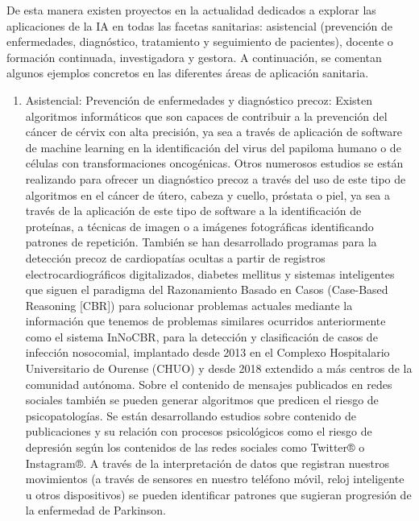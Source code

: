 \documentclass[10pt]{article}
\begin{document}
        
        De esta manera existen proyectos en la actualidad dedicados a explorar las aplicaciones de la IA en todas las facetas sanitarias: asistencial (prevención de enfermedades, diagnóstico, tratamiento y seguimiento de pacientes), docente o formación continuada, investigadora y gestora. A continuación, se comentan algunos ejemplos concretos en las diferentes áreas de aplicación sanitaria.
\begin{enumerate}
    \item Asistencial: Prevención de enfermedades y diagnóstico precoz: Existen algoritmos informáticos que son capaces de contribuir a la prevención del cáncer de cérvix con alta precisión, ya sea a través de aplicación de software de machine learning en la identiﬁcación del virus del papiloma humano o de células con transformaciones oncogénicas. Otros numerosos estudios se están realizando para ofrecer un diagnóstico precoz a través del uso de este tipo de algoritmos en el cáncer de útero, cabeza y cuello, próstata o piel, ya sea a través de la aplicación de este tipo de software a la identiﬁcación de proteínas, a técnicas de imagen o a imágenes fotográﬁcas identiﬁcando patrones de repetición. También se han desarrollado programas para la detección precoz de cardiopatías ocultas a partir de registros electrocardiográﬁcos digitalizados, diabetes mellitus y sistemas inteligentes que siguen el paradigma del Razonamiento Basado en Casos (Case-Based Reasoning [CBR]) para solucionar problemas actuales mediante la información que tenemos de problemas similares ocurridos anteriormente como el sistema InNoCBR, para la detección y clasiﬁcación de casos de infección nosocomial, implantado desde 2013 en el Complexo Hospitalario Universitario de Ourense (CHUO) y desde 2018 extendido a más centros de la comunidad autónoma. Sobre el contenido de mensajes publicados en redes sociales también se pueden generar algoritmos que predicen el riesgo de psicopatologías. Se están desarrollando estudios sobre contenido de publicaciones y su relación con procesos psicológicos como el riesgo de depresión según los contenidos de las redes sociales como Twitter® o Instagram®. A través de la interpretación de datos que registran nuestros movimientos (a través de sensores en nuestro teléfono móvil, reloj inteligente u otros dispositivos) se pueden identiﬁcar patrones que sugieran progresión de la enfermedad de Parkinson.

\end{enumerate}
\end{document}
